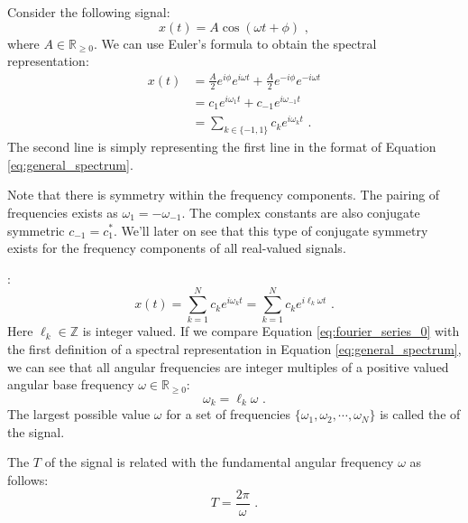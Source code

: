 Consider the following signal:
\begin{equation}
x(t)=A\cos(\omega t+\phi) \,\,,
\end{equation}
where $A\in \mathbb{R}_{\ge 0}$. We can use Euler's formula to obtain the spectral representation:
\begin{align}
x(t) & = \frac{A}{2}e^{i\phi}e^{i\omega t} + \frac{A}{2}e^{-i\phi}e^{-i\omega t} \\
     & = c_1 e^{i\omega_1 t} + c_{-1} e^{i\omega_{-1} t} \\
     & = \sum_{k\in\{-1,1\}} c_k e^{i\omega_k t} \,\,.
\end{align}
The second line is simply representing the first line in the format of Equation \ref{eq:general_spectrum}.

Note that there is symmetry within the frequency components. The pairing of frequencies exists as $\omega_{1}=-\omega_{-1}$. 
The complex constants are also conjugate symmetric $c_{-1} = c_{1}^*$. We'll later on see that this type of conjugate symmetry exists for the frequency components of all real-valued signals.

:
\begin{equation}
x(t) = \sum_{k=1}^N c_k e^{i \omega_k t} = \sum_{k=1}^N c_k e^{i \ell_k \omega t} \,\,.
\label{eq:fourier_series_0}
\end{equation}
Here $\ell_k \in \mathbb{Z}$ is integer valued. If we compare Equation \ref{eq:fourier_series_0} with the first definition of a spectral representation in Equation \ref{eq:general_spectrum}, we can see that all angular frequencies are integer multiples of a positive valued angular base frequency $\omega \in \mathbb{R}_{\ge 0}$:
\begin{equation}
\omega_k = \ell_k\omega \,\,.
\label{eq:integer_multiple}
\end{equation}
The largest possible value $\omega$ for a set of frequencies $\{\omega_1,\omega_2,\cdots,\omega_N\}$ is called the \emph{} of the signal.

The \emph{} $T$ of the signal is related with the fundamental angular frequency $\omega$ as follows:
\begin{equation}
\boxed{
T = \frac{2\pi}{\omega}
} \,\,.
\label{eq:fundamental_period}
\end{equation}


